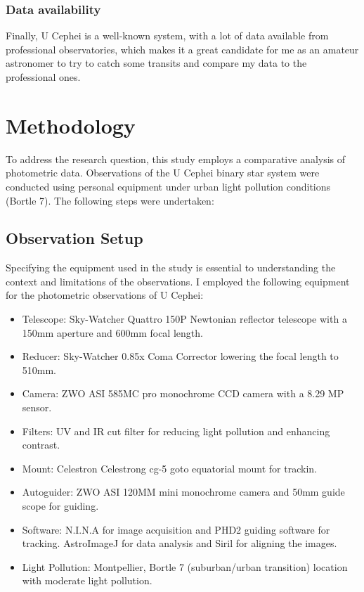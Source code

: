 \documentclass[12pt,a4paper]{article}
\begin{document}
\subsubsection{Data availability}

Finally, U Cephei is a well-known system, with a lot of data available from professional observatories, which makes it a great candidate for me as an amateur astronomer to try to catch some transits and compare my data to the professional ones.

\section{Methodology}
To address the research question, this study employs a comparative analysis of photometric data. Observations of the U Cephei binary star system were conducted using personal equipment under urban light pollution conditions (Bortle 7). The following steps were undertaken:

\subsection{Observation Setup}

Specifying the equipment used in the study is essential to understanding the context and limitations of the observations. 
I employed the following equipment for the photometric observations of U Cephei:

\begin{itemize}
    \item Telescope: Sky-Watcher Quattro 150P Newtonian reflector telescope with a 150mm aperture and 600mm focal length.
    \item Reducer: Sky-Watcher 0.85x Coma Corrector lowering the focal length to 510mm.
    \item Camera: ZWO ASI 585MC pro monochrome CCD camera with a 8.29 MP sensor.
    \item Filters: UV and IR cut filter for reducing light pollution and enhancing contrast.
    \item Mount: Celestron Celestrong cg-5 goto equatorial mount for trackin.
    \item Autoguider: ZWO ASI 120MM mini monochrome camera and 50mm guide scope for guiding.
    \item Software: N.I.N.A for image acquisition and PHD2 guiding software for tracking. AstroImageJ for data analysis and Siril for aligning the images.
    \item Light Pollution: Montpellier, Bortle 7 (suburban/urban transition) location with moderate light pollution.
\end{itemize}
\end{document}
